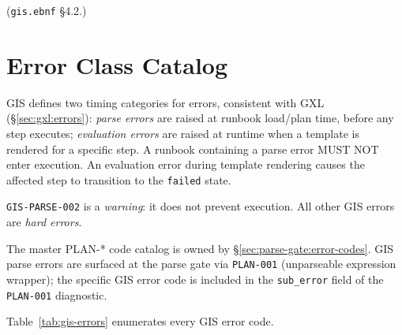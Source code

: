 (\texttt{gis.ebnf} \S4.2.)

\section{Error Class Catalog}
\label{sec:gis:errors}

GIS defines two timing categories for errors, consistent with GXL
(\S\ref{sec:gxl:errors}):
\emph{parse errors} are raised at runbook load/plan time, before any step
executes;
\emph{evaluation errors} are raised at runtime when a template is rendered
for a specific step.
A runbook containing a parse error MUST NOT enter execution.
An evaluation error during template rendering causes the affected step
to transition to the \texttt{failed} state.

\texttt{GIS-PARSE-002} is a \emph{warning}: it does not prevent execution.
All other GIS errors are \emph{hard errors}.

The master PLAN-* code catalog is owned by \S\ref{sec:parse-gate:error-codes}.
GIS parse errors are surfaced at the parse gate via \texttt{PLAN-001}
(unparseable expression wrapper); the specific GIS error code is included
in the \texttt{sub\_error} field of the \texttt{PLAN-001} diagnostic.

Table~\ref{tab:gis-errors} enumerates every GIS error code.


